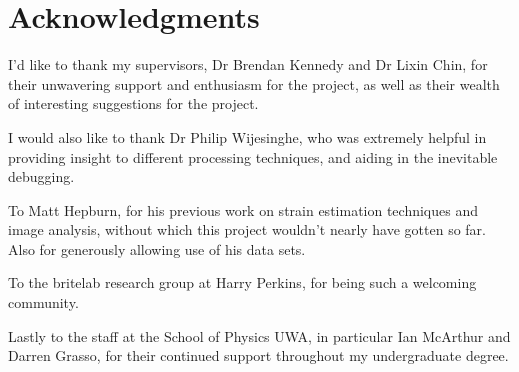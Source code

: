 \chapter*{Acknowledgments}
\thispagestyle{empty}

I'd like to thank my supervisors, Dr Brendan Kennedy and Dr Lixin Chin, for their unwavering support and enthusiasm for the project, as well as their wealth of interesting suggestions for the project. 

I would also like to thank Dr Philip Wijesinghe, who was extremely helpful in providing insight to different processing techniques, and aiding in the inevitable debugging.

To Matt Hepburn, for his previous work on strain estimation techniques and image analysis, without which this project wouldn't nearly have gotten so far. Also for generously allowing use of his data sets. 

To the \ac{britelab} research group at Harry Perkins, for being such a welcoming community. 

Lastly to the staff at the School of Physics UWA, in particular Ian McArthur and Darren Grasso, for their continued support throughout my undergraduate degree. 
